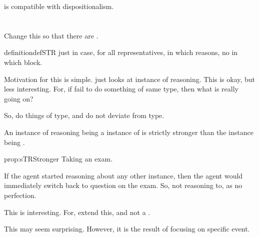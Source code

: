 \begin{note}
  \tR{} is compatible with dispositionalism.

\end{note}

\section{}
\label{cha:typical:sec:sTR}


{
  \color{red}
  Change this so that there are .
}

\begin{note}
  \begin{restatable}[\sTR{2}]{definition}{defSTR}
    \sTR{} just in case, for all representatives, \pevent{} in which reasons, no \pevent{} in which block.
  \end{restatable}

  Motivation for this is simple.
  \tR{} just looks at instance of reasoning.
  This is okay, but less interesting.
  For, if fail to do something of same type, then what is really going on?

  So, do things of type, and do not deviate from type.
\end{note}

\begin{note}
  \begin{proposition}
    \label{prop:sTRStronger}
    An instance of reasoning being a instance of \sTR{} is strictly stronger than the instance being \tR{}.
  \end{proposition}

  \begin{argument}{prop:sTRStronger}
    Taking an exam.

    If the agent started reasoning about any other instance, then the agent would immediately switch back to question on the exam.
    So, not reasoning to, as no perfection.
  \end{argument}

  This is interesting.
  For, extend this, and not a \fc{}.

  This may seem surprising.
  However, it is the result of focusing on specific event.
\end{note}

